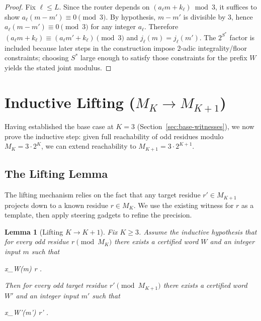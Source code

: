 \documentclass[11pt,letterpaper]{amsart}
\def\[{ }%
\def\]{ }%
\theoremstyle{definition}
\theoremstyle{plain}
\newtheorem{lemma}{Lemma}
\theoremstyle{plain}
\theoremstyle{remark}
\begin{document}
\begin{proof}
Fix $\ell\le L$. Since the router depends on $(a_\ell m+k_\ell)\bmod 3$, it suffices to
show $a_\ell(m-m')\equiv 0\pmod 3$.
By hypothesis, $m-m'$ is divisible by $3$, hence $a_\ell(m-m')\equiv 0\pmod 3$ for any
integer $a_\ell$. Therefore $(a_\ell m+k_\ell)\equiv(a_\ell m'+k_\ell)\pmod 3$ and
$j_\ell(m)=j_\ell(m')$.
The $2^{S^\ast}$ factor is included because later steps in the construction impose
$2$-adic integrality/floor constraints; choosing $S^\ast$ large enough to satisfy those
constraints for the prefix $W$ yields the stated joint modulus.
\end{proof}

\section{Inductive Lifting (\texorpdfstring{$M_K \to M_{K+1}$}{MK -> MK+1})}
\label{sec:inductive-lifting}

Having established the base case at $K=3$ (Section~\ref{sec:base-witnesses}), we now prove the inductive step: given full reachability of odd residues modulo $M_K = 3 \cdot 2^K$, we can extend reachability to $M_{K+1} = 3 \cdot 2^{K+1}$.


\subsection{The Lifting Lemma}
The lifting mechanism relies on the fact that any target residue $r' \in M_{K+1}$ projects down to a known residue $r \in M_K$. We use the existing witness for $r$ as a template, then apply steering gadgets to refine the precision.

\begin{lemma}[Lifting $K \to K+1$]
\label{lem:lifting}
Fix $K \ge 3$. Assume the inductive hypothesis that for every odd residue
$r \pmod{M_K}$ there exists a certified word $W$ and an integer input $m$ such that
\[
x_W(m) \equiv r .
\]
Then for every odd target residue $r' \pmod{M_{K+1}}$ there exists a certified word
$W'$ and an integer input $m'$ such that
\[
x_{W'}(m') \equiv r' .
\]
\end{lemma}
\end{document}
